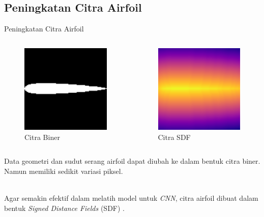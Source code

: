 \subsection{Peningkatan Citra Airfoil}
\begin{frame}{Peningkatan Citra Airfoil}
  \begin{columns}[t]
    \begin{column}{.5\linewidth}
      \begin{figure}[h]
        \centering
        \includegraphics[width=0.35\linewidth]{statics/biner}
        \caption{Citra Biner}
        \label{fig:biner}
      \end{figure}
    \end{column}
    \begin{column}{.5\linewidth}
      \begin{figure}[h]
        \centering
        \includegraphics[width=0.35\linewidth]{statics/sdf}
        \caption{Citra SDF}
        \label{fig:biner}
      \end{figure}
    \end{column}
  \end{columns}

  Data geometri dan sudut serang airfoil dapat diubah ke dalam bentuk citra biner. Namun memiliki sedikit variasi piksel. \\~\\

  \pause

  Agar semakin efektif dalam melatih model untuk \textit{CNN}, citra airfoil dibuat dalam bentuk \textit{Signed Distance Fields} (SDF) \cite{guo2016convolutional}.\\~\\
\end{frame}

